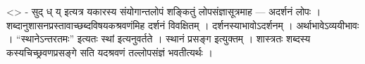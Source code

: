 \textless{}\textgreater{} - सुद् ध् य् इत्यत्र यकारस्य संयोगान्तलोपं
शङ्कितुं लोपसंज्ञासूत्रमाह --- अदर्शनं लोपः ।
शब्दानुशासनप्रस्तावाच्छब्दविषयकश्रवणंमिह दर्शनं विवक्षितम् ।
दर्शनस्याभावोऽदर्शनम् । अर्थाभावेऽव्ययीभावः । ``स्थानेऽन्तरतमः'' इत्यतः
स्थां इत्यनुवर्तते । स्थानं प्रसङ्ग इत्युक्तम् । शास्त्रतः शब्दस्य
कस्यचिच्छ्रवणप्रसङ्गे सति यदश्रवणं तल्लोपसंज्ञं भवतीत्यर्थः ।
